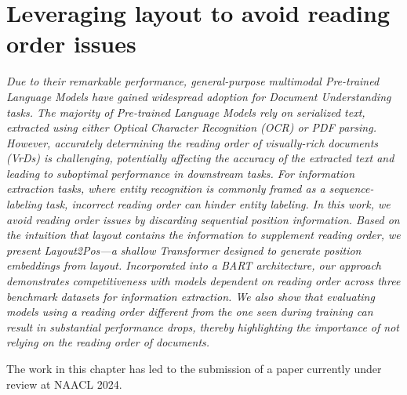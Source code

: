 
\chapter{Leveraging layout to avoid reading order issues}
\label{chapter:layout2pos}

\renewcommand{\leftmark}{\spacedlowsmallcaps{Leveraging layout to avoid reading order issues}}

\begin{chapabstract}
    {\em
    Due to their remarkable performance, general-purpose multimodal Pre-trained Language Models have gained widespread adoption for Document Understanding tasks. The majority of Pre-trained Language Models rely on serialized text, extracted using either Optical Character Recognition (OCR) or PDF parsing. However, accurately determining the reading order of visually-rich documents (VrDs) is challenging, potentially affecting the accuracy of the extracted text and leading to suboptimal performance in downstream tasks. For information extraction tasks, where entity recognition is commonly framed as a sequence-labeling task, incorrect reading order can hinder entity labeling. In this work, we avoid reading order issues by discarding sequential position information. Based on the intuition that layout contains the information to supplement reading order, we present Layout2Pos—a shallow Transformer designed to generate position embeddings from layout. Incorporated into a BART architecture, our approach demonstrates competitiveness with models dependent on reading order across three benchmark datasets for information extraction. We also show that evaluating models using a reading order different from the one seen during training can result in substantial performance drops, thereby highlighting the importance of not relying on the reading order of documents. \\
    \vspace*{5mm}

    The work in this chapter has led to the submission of a paper currently under review at NAACL 2024.}
\end{chapabstract}



\newpage

\minitoc
{}

